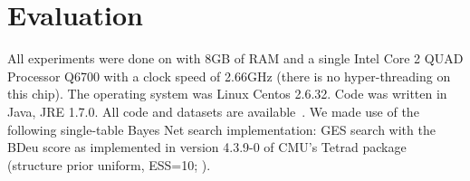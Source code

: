\documentclass{vldb}
\begin{document}
\section{Evaluation} 
All experiments were done on with 8GB of RAM and a single Intel Core 2 QUAD Processor Q6700 with a clock speed of 2.66GHz (there is no hyper-threading on this chip). 
The operating system was Linux Centos 2.6.32. Code was written in Java, JRE 1.7.0. All code and datasets are available~\cite{bib:jbnsite}.
We made use of the following single-table Bayes Net search implementation:  GES search \cite{Chickering2003} with the BDeu score as implemented in version 4.3.9-0 of CMU's Tetrad package (structure prior uniform, ESS=10; \cite{2008a}).
\begin{table}[hbtp] \centering
\caption{Datasets characteristics. \#Tuples = total number of tuples over all tables. 
  \label{table:datasetsize}}
\end{table}
\end{document}
